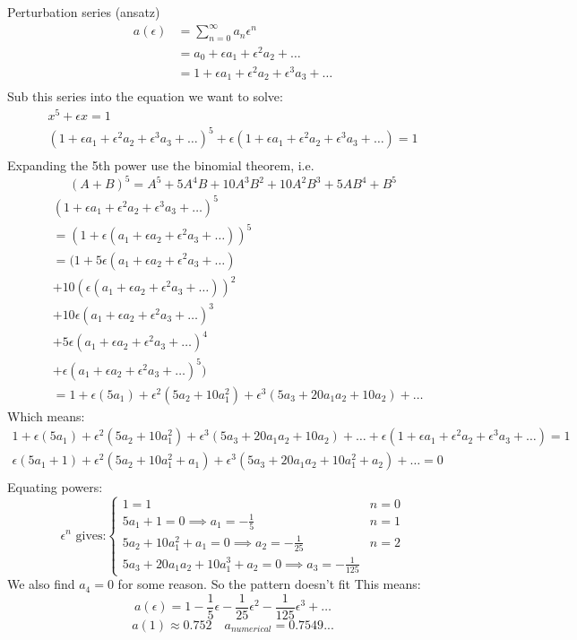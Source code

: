 \documentclass{/home/janmebows/Documents/LatexTemplates/myassignment}
\begin{document}
Perturbation series (ansatz)
\begin{align*}
    a(\epsilon) &= \sum_{n=0}^\infty a_n \epsilon^n\\
    &= a_0 + \epsilon a_1 + \epsilon^2 a_2 + \hdots\\
    &= 1 + \epsilon a_1 + \epsilon^2 a_2 + \epsilon^3a_3 + \hdots\\
\end{align*}
Sub this series into the equation we want to solve:
\begin{align*}
    x^5 + \epsilon x =1\\
    \left(1 + \epsilon a_1 + \epsilon^2 a_2 + \epsilon^3 a_3 + \hdots \right)^5  + \epsilon\left(1 + \epsilon a_1 + \epsilon^2 a_2 + \epsilon^3 a_3 + \hdots \right) = 1\\
\end{align*}
Expanding the 5th power use the binomial theorem, i.e.
\[(A+B)^5 = A^5 + 5A^4B + 10A^3B^2 + 10A^2B^3 + 5AB^4 +  B^5\]
\begin{align*}
    &\left(1 + \epsilon a_1 + \epsilon^2 a_2 + \epsilon^3 a_3 + \hdots \right)^5\\
    &= \left(1 + \epsilon (a_1 + \epsilon a_2 + \epsilon^2 a_3 + \hdots) \right)^5\\
    &=(1 + 5\epsilon (a_1 + \epsilon a_2 + \epsilon^2 a_3 + \hdots)\\
    &+ 10 (\epsilon (a_1 + \epsilon a_2 + \epsilon^2 a_3 + \hdots))^2\\
    &+ 10\epsilon (a_1 + \epsilon a_2 + \epsilon^2 a_3 + \hdots)^3 \\
    &+ 5\epsilon (a_1 + \epsilon a_2 + \epsilon^2 a_3 + \hdots)^4\\
    &+ \epsilon (a_1 + \epsilon a_2 + \epsilon^2 a_3 + \hdots)^5)\\
    &= 1 + \epsilon(5a_1) + \epsilon^2 (5a_2 + 10a_1^2) + \epsilon^3(5a_3 + 20a_1a_2 + 10a_2) + \hdots
\end{align*}
Which means:
\begin{align*}
    1 + \epsilon(5a_1) + \epsilon^2 (5a_2 + 10a_1^2) + \epsilon^3(5a_3 + 20a_1a_2 + 10a_2) + \hdots + \epsilon(1+\epsilon a_1 + \epsilon^2 a_2 + \epsilon^3 a_3 + \hdots) = 1\\
    \epsilon(5a_1 +1) + \epsilon^2 (5a_2 + 10a_1^2 + a_1) + \epsilon^3(5a_3 + 20a_1a_2 + 10a_1^2 + a_2) + \hdots =0\\
\end{align*}
Equating powers:
\[\epsilon^n \text{ gives:} \begin{cases}
1=1&n=0\\
5a_1 +1 =0 \implies a_1 = -\frac15 & n=1\\
5a_2 + 10a_1^2 + a_1 = 0 \implies a_2 = -\frac1{25} & n=2\\
5a_3 + 20a_1a_2 + 10a_1^3 + a_2 = 0 \implies a_3 = -\frac{1}{125}
\end{cases}\]
We also find $a_4 = 0$ for some reason. So the pattern doesn't fit
This means:
\[a(\epsilon) = 1 - \frac15 \epsilon - \frac1{25} \epsilon^2 - \frac1{125} \epsilon^3 + \hdots\]
\[a(1) \approx 0.752 \quad a_{numerical} = 0.7549...\]
\end{document}
